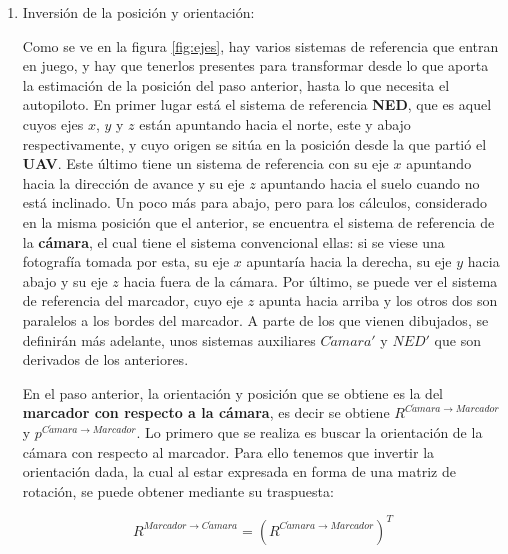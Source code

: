 \begin{enumerate}

\item Inversión de la posición y orientación:
	\figEjes

	Como se ve en la figura \ref{fig:ejes}, hay varios sistemas de referencia que entran en juego, y hay que tenerlos presentes para transformar desde lo que aporta la estimación de la posición del paso anterior, hasta lo que necesita el autopiloto. En primer lugar está el sistema de referencia \textbf{NED}, que es aquel cuyos ejes $x$, $y$ y $z$ están apuntando hacia el norte, este y abajo respectivamente, y cuyo origen se  sitúa en la posición desde la que partió el \textbf{UAV}. Este último tiene un sistema de referencia con su eje $x$ apuntando hacia la dirección de avance y su eje $z$ apuntando hacia el suelo cuando no está inclinado. Un poco más para abajo, pero para los cálculos, considerado en la misma posición que el anterior, se encuentra el sistema de referencia de la \textbf{cámara}, el cual tiene el sistema convencional ellas: si se viese una fotografía tomada por esta, su eje $x$ apuntaría hacia la derecha, su eje $y$ hacia abajo y su eje $z$ hacia fuera de la cámara. Por último, se puede ver el sistema de referencia del marcador, cuyo eje $z$ apunta hacia arriba y los otros dos son paralelos a los bordes del marcador. A parte de los que vienen dibujados, se definirán más adelante, unos sistemas auxiliares $C\acute{a}mara'$ y $NED'$ que son derivados de los anteriores. 

	En el paso anterior, la orientación y posición que se obtiene es la del \textbf{marcador con respecto a la cámara}, es decir se obtiene $R^{C\acute{a}mara \rightarrow Marcador}$ y $p^{C\acute{a}mara \rightarrow Marcador}$. Lo primero que se realiza es buscar la orientación de la cámara con respecto al marcador. Para ello tenemos que invertir la orientación dada, la cual al estar expresada en forma de una matriz de rotación, se puede obtener mediante su traspuesta:

	\begin{equation}
	R^{Marcador \rightarrow C\acute{a}mara } = \left(R^{C\acute{a}mara \rightarrow Marcador}\right)^T
	\end{equation}



\end{enumerate}
